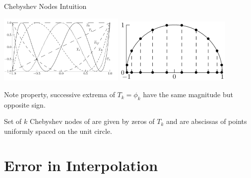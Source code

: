 \begin{frame}{Chebyshev Nodes Intuition}


{

\centering
\includegraphics[width=2.4in]{diagrams/cheb_funs}
\includegraphics[width=2.2in]{diagrams/chebyshev_nodes}

}
\begin{itemize}
\mitem Note  property, successive extrema of $T_k=\phi_k$ have the same magnitude but opposite sign.


\mitem Set of $k$ Chebyshev nodes of are given by zeros of $T_k$ and are abscissas of points uniformly spaced on the unit circle.

\end{itemize}

\end{frame}



%
%
%
%
%
%
%
%
%
\section{Error in Interpolation}

